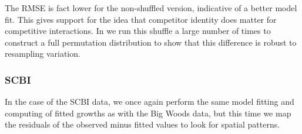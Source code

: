 \documentclass[12pt]{article}
\newenvironment{Shaded}{\begin{snugshade}}{\end{snugshade}}
\newcommand{\CommentTok}[1]{\textcolor[rgb]{0.56,0.35,0.01}{\textit{#1}}}
\newcommand{\DataTypeTok}[1]{\textcolor[rgb]{0.13,0.29,0.53}{#1}}
\newcommand{\KeywordTok}[1]{\textcolor[rgb]{0.13,0.29,0.53}{\textbf{#1}}}
\newcommand{\NormalTok}[1]{#1}
\newcommand{\OperatorTok}[1]{\textcolor[rgb]{0.81,0.36,0.00}{\textbf{#1}}}
\newcommand{\OtherTok}[1]{\textcolor[rgb]{0.56,0.35,0.01}{#1}}
\newcommand{\StringTok}[1]{\textcolor[rgb]{0.31,0.60,0.02}{#1}}
\begin{document}
\begin{Shaded}
\end{Shaded}

The RMSE is fact lower for the non-shuffled version, indicative of a
better model fit. This gives support for the idea that competitor
identity does matter for competitive interactions. In
\citet{allen_permutation_2020} we run this shuffle a large number of
times to construct a full permutation distribution to show that this
difference is robust to resampling variation.

\hypertarget{scbi-3}{%
\subsubsection{SCBI}\label{scbi-3}}

In the case of the SCBI data, we once again perform the same model
fitting and computing of fitted growths as with the Big Woods data, but
this time we map the residuals of the observed minus fitted values to
look for spatial patterns.

\begin{Shaded}
\end{Shaded}

\begin{Shaded}
\end{Shaded}
\end{document}
